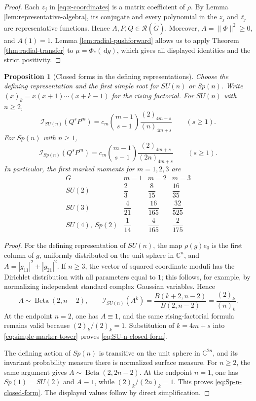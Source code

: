 \documentclass[11pt]{article}
\numberwithin{equation}{section}
\newtheorem{proposition}[theorem]{Proposition}
\newcommand{\C}{\mathbb C}
\newcommand{\cR}{\mathcal R}
\newcommand{\cI}{\mathcal I}
\newcommand{\dd}{\,\mathrm d}
\begin{document}
\begin{proof}
Each $z_j$ in \eqref{eq:z-coordinates} is a matrix coefficient of $\rho$.
By Lemma \ref{lem:representative-algebra}, its conjugate and every polynomial
in the $z_j$ and $\overline{z_j}$ are representative functions.  Hence
$A,P,Q\in\cR(\widetilde G)$.  Moreover, $A=\|\Phi\|^2\geq0$, and
$A(1)=1$.  Lemma \ref{lem:radial-pushforward} allows us to apply Theorem
\ref{thm:radial-transfer} to $\mu=\Phi_*(\dd g)$, which gives all displayed
identities and the strict positivity.
\end{proof}

\begin{proposition}[Closed forms in the defining representations]
\label{prop:classical-closed-forms}
Choose the defining representation and the first simple root for $SU(n)$ or
$Sp(n)$.  Write $(x)_k=x(x+1)\cdots(x+k-1)$ for the rising factorial.  For
$SU(n)$ with $n\geq2$,
\begin{equation}\label{eq:SU-n-closed-form}
 \cI_{SU(n)}(Q^sP^m)
 =c_m\binom{m-1}{s-1}\frac{(2)_{4m+s}}{(n)_{4m+s}}
 \qquad(s\geq1).
\end{equation}
For $Sp(n)$ with $n\geq1$,
\begin{equation}\label{eq:Sp-n-closed-form}
 \cI_{Sp(n)}(Q^sP^m)
 =c_m\binom{m-1}{s-1}\frac{(2)_{4m+s}}{(2n)_{4m+s}}
 \qquad(s\geq1).
\end{equation}
In particular, the first marked
moments for $m=1,2,3$ are
\[
\begin{array}{c|ccc}
 G & m=1 & m=2 & m=3 \\ \hline
 SU(2) & \dfrac23 & \dfrac8{15} & \dfrac{16}{35} \\[3pt]
 SU(3) & \dfrac4{21} & \dfrac{16}{165} & \dfrac{32}{525} \\[3pt]
 SU(4),\ Sp(2) & \dfrac1{14} & \dfrac4{165} & \dfrac2{175}
\end{array}
\]
\end{proposition}

\begin{proof}
For the defining representation of $SU(n)$, the map $\rho(g)e_0$ is the first
column of $g$, uniformly distributed on the unit sphere in $\C^n$, and
$A=|g_{11}|^2+|g_{21}|^2$.  If $n\geq3$, the vector of squared coordinate
moduli has the Dirichlet distribution with all parameters equal to $1$;
this follows, for example, by normalizing independent standard complex
Gaussian variables.  Hence
\[
 A\sim\operatorname{Beta}(2,n-2),
 \qquad
 \cI_{SU(n)}(A^k)=\frac{B(k+2,n-2)}{B(2,n-2)}
 =\frac{(2)_k}{(n)_k}.
\]
At the endpoint $n=2$, one has $A\equiv1$, and the same rising-factorial
formula remains valid because $(2)_k/(2)_k=1$.  Substitution of $k=4m+s$ into
\eqref{eq:simple-marker-tower} proves \eqref{eq:SU-n-closed-form}.

The defining action of $Sp(n)$ is transitive on the unit sphere in
$\C^{2n}$, and its invariant probability measure there is normalized surface
measure.  For $n\geq2$, the same argument gives
$A\sim\operatorname{Beta}(2,2n-2)$.  At the endpoint $n=1$, one has
$Sp(1)=SU(2)$ and $A\equiv1$, while $(2)_k/(2n)_k=1$.  This proves
\eqref{eq:Sp-n-closed-form}.  The displayed values follow by direct
simplification.
\end{proof}
\end{document}
